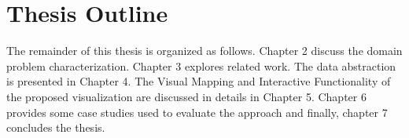 \section{Thesis Outline}

The remainder of this thesis is organized as follows. Chapter 2 discuss the domain problem characterization. Chapter 3 explores related work. The data abstraction is presented in Chapter 4. The Visual Mapping and Interactive Functionality of the proposed visualization are discussed in details in Chapter 5. Chapter 6 provides some case studies used to evaluate the approach and finally, chapter 7 concludes the thesis.

